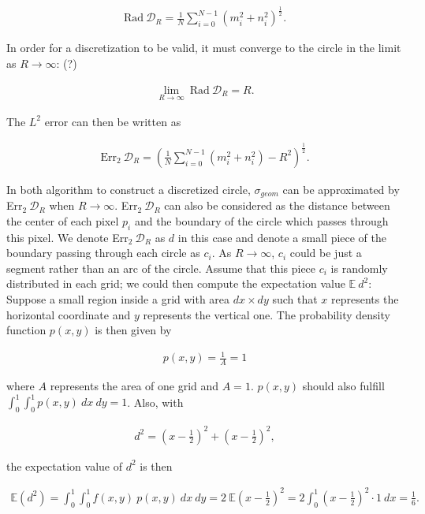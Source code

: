 \documentclass[letterpaper]{article}
\numberwithin{equation}{section} %
\numberwithin{figure}{section} %
\numberwithin{table}{section} %
\begin{document}
\begin{align} 
\text{Rad} \ \mathcal{D}_R=\frac{1}{N} \sum_{i=0}^{N-1} (m_i^2+n_i^2)^{\frac{1}{2}}.
\end{align}

\noindent
In order for a discretization to be valid, it must converge to the circle in the limit as $R \rightarrow \infty$: (?)

\begin{align} 
\lim_{R \rightarrow \infty} \ \text{Rad} \ \mathcal{D}_R = R.
\end{align}

\noindent
The $L^2$ error can then be written as 

\begin{align} 
\text{Err}_2 \ \mathcal{D}_R=(\frac{1}{N} \sum_{i=0}^{N-1} (m_i^2+n_i^2)-R^2)^{\frac{1}{2}}.
\end{align}


In both algorithm to construct a discretized circle, $\sigma_{geom}$ can be approximated by Err$_2 \ \mathcal{D}_R$ when $R \rightarrow \infty$. Err$_2 \ \mathcal{D}_R$ can also be considered as the distance between the center of each pixel $p_i$ and the boundary of the circle which passes through this pixel. We denote Err$_2 \ \mathcal{D}_R$ as $d$ in this case and denote a small piece of the boundary passing through each circle as $c_i$. As $R \rightarrow \infty$, $c_i$ could be just a segment rather than an arc of the circle. Assume that this piece $c_i$ is randomly distributed in each grid; we could then compute the expectation value $\mathbb{E}\ d^2$: Suppose a small region inside a grid with area $dx \times dy$ such that $x$ represents the horizontal coordinate and $y$ represents the vertical one. The probability density function $p(x,y)$ is then given by

\begin{align} 
p(x,y)=\frac{1}{A}=1
\end{align}

\noindent
where $A$ represents the area of one grid and $A=1$. $p(x,y)$ should also fulfill $\int_{0}^{1}\int_{0}^{1}p(x,y) \ dx \ dy=1$. Also, with 

\begin{align} 
d^2=(x-\frac{1}{2})^2+(x-\frac{1}{2})^2,
\end{align}

\noindent
the expectation value of $d^2$ is then

\begin{align} 
\mathbb{E}(d^2) = \int_{0}^{1} \int_{0}^{1}f(x,y) \ p(x,y) \ dx \ dy = 2 \  \mathbb{E}(x-\frac{1}{2})^2 = 2 \int_{0}^{1}(x-\frac{1}{2})^2 \cdot 1 \ dx = \frac{1}{6}.
\end{align}
\end{document}

